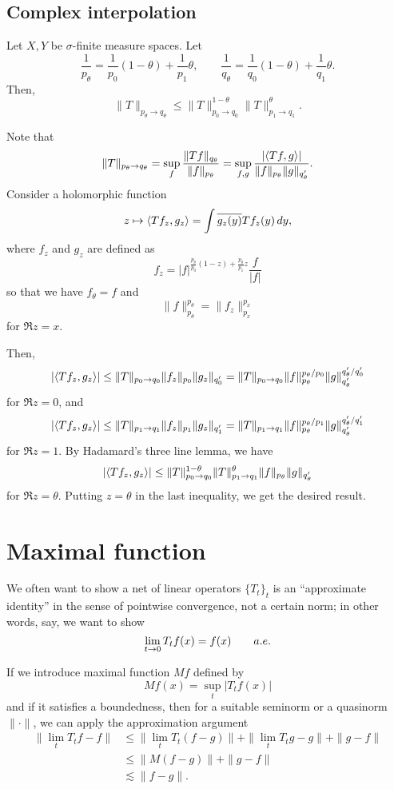 \documentclass{../crs}
\begin{document}
\subsection{Complex interpolation}
\begin{thm}
Let $X,Y$ be $\sigma$-finite measure spaces.
Let
\[\frac1{p_\theta}=\frac1{p_0}(1-\theta)+\frac1{p_1}\theta,\qquad\frac1{q_\theta}=\frac1{q_0}(1-\theta)+\frac1{q_1}\theta.\]
Then,
\[\|T\|_{p_\theta\to q_\theta}\le\|T\|_{p_0\to q_0}^{1-\theta}\|T\|_{p_1\to q_1}^\theta.\]
\end{thm}
\begin{pf}
Note that
\[\|T\|_{p_\theta\to q_\theta}=\sup_f\frac{\|Tf\|_{q_\theta}}{\|f\|_{p_\theta}}=\sup_{f,g}\frac{\abs{\inn{Tf}{g}}}{\|f\|_{p_\theta}\|g\|_{q'_\theta}}.\]
Consider a holomorphic function
\[z\mapsto\left\langle Tf_z,g_z\right\rangle=\int\overline{g_z(y)}Tf_z(y)\,dy,\]
where $f_z$ and $g_z$ are defined as
\[f_z=|f|^{\frac{p_\theta}{p_0}(1-z)+\frac{p_\theta}{p_1}z}\frac f{|f|}\]
so that we have $f_\theta=f$ and
\[\|f\|_{p_\theta}^{p_\theta}=\|f_z\|_{p_x}^{p_x}\]
for $\Re z=x$.

Then,
\[\abs{\inn{Tf_z}{g_z}}\le\|T\|_{p_0\to q_0}\|f_z\|_{p_0}\|g_z\|_{q'_0}=\|T\|_{p_0\to q_0}\|f\|_{p_\theta}^{p_\theta/p_0}\|g\|_{q'_\theta}^{q'_\theta/q'_0}\]
for $\Re z=0$, and
\[\abs{\inn{Tf_z}{g_z}}\le\|T\|_{p_1\to q_1}\|f_z\|_{p_1}\|g_z\|_{q'_1}=\|T\|_{p_1\to q_1}\|f\|_{p_\theta}^{p_\theta/p_1}\|g\|_{q'_\theta}^{q'_\theta/q'_1}\]
for $\Re z=1$.
By Hadamard's three line lemma, we have
\[\abs{\inn{Tf_z}{g_z}}\le\|T\|_{p_0\to q_0}^{1-\theta}\|T\|_{p_1\to q_1}^\theta\|f\|_{p_\theta}\|g\|_{q'_\theta}\]
for $\Re z=\theta$.
Putting $z=\theta$ in the last inequality, we get the desired result.
\end{pf}









\section{Maximal function}

We often want to show a net of linear operators $\{T_t\}_t$ is an ``approximate identity'' in the sense of pointwise convergence, not a certain norm; in other words, say, we want to show
\[\lim_{t\to0}T_tf(x)=f(x)\for a.e.\]

If we introduce maximal function $Mf$ defined by
\[Mf(x)=\sup_t|T_tf(x)|\]
and if it satisfies a boundedness, then for a suitable seminorm or a quasinorm $\|\cdot\|$, we can apply the approximation argument
\begin{align*}
\|\lim_t T_tf-f\|&\le \|\lim_t T_t(f-g)\|+\|\lim_t T_tg-g\|+\|g-f\|\\&\le \|M(f-g)\|+\|g-f\|\\&\lesssim \|f-g\|.
\end{align*}
\end{document}
